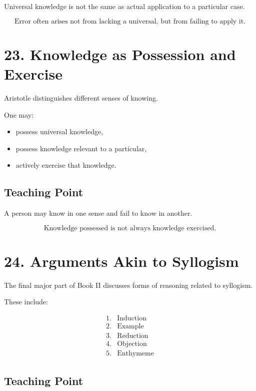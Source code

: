 \documentclass[12pt]{article}
\begin{document}
Universal knowledge is not the same as actual application to a particular case.

\[
\boxed{
\text{Error often arises not from lacking a universal, but from failing to apply it.}
}
\]

\section*{23. Knowledge as Possession and Exercise}

Aristotle distinguishes different senses of knowing.

One may:

\begin{itemize}[itemsep=0.25em]
    \item possess universal knowledge,
    \item possess knowledge relevant to a particular,
    \item actively exercise that knowledge.
\end{itemize}

\subsection*{Teaching Point}

A person may know in one sense and fail to know in another.

\[
\boxed{
\text{Knowledge possessed is not always knowledge exercised.}
}
\]

\section*{24. Arguments Akin to Syllogism}

The final major part of Book II discusses forms of reasoning related to
syllogism.

These include:

\[
\begin{array}{ll}
1. & \text{Induction} \\
2. & \text{Example} \\
3. & \text{Reduction} \\
4. & \text{Objection} \\
5. & \text{Enthymeme}
\end{array}
\]

\subsection*{Teaching Point}
\end{document}
